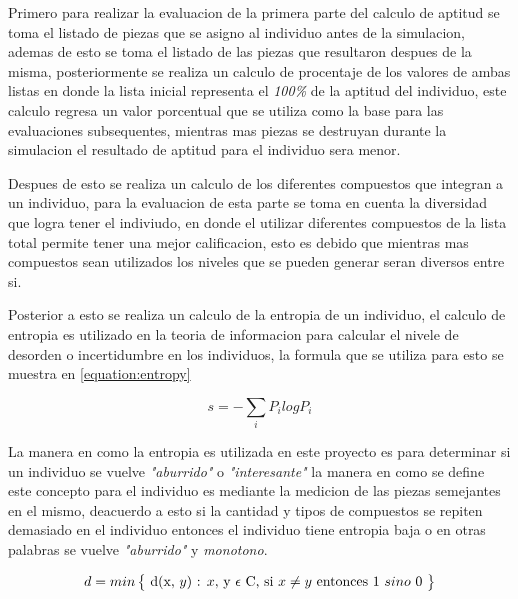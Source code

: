 Primero para realizar la evaluacion de la primera parte del calculo de aptitud
se toma el listado de piezas que se asigno al individuo antes de la simulacion,
ademas de esto se toma el listado de las piezas que resultaron despues de la
misma, posteriormente se realiza un calculo de procentaje de los valores de
ambas listas en donde la lista inicial representa el \textit{100\%} de la
aptitud del individuo, este calculo regresa un valor porcentual que se utiliza
como la base para las evaluaciones subsequentes, mientras mas piezas se
destruyan durante la simulacion el resultado de aptitud para el individuo sera
menor.

Despues de esto se realiza un calculo de los diferentes compuestos que integran
a un individuo, para la evaluacion de esta parte se toma en cuenta la diversidad
que logra tener el indiviudo, en donde el utilizar diferentes compuestos de la
lista total permite tener una mejor calificacion, esto es debido que mientras
mas compuestos sean utilizados los niveles que se pueden generar seran diversos
entre si.

Posterior a esto se realiza un calculo de la entropia de un individuo, el
calculo de entropia es utilizado en la teoria de informacion para calcular el
nivele de desorden o incertidumbre en los individuos, la formula que se utiliza
para esto se muestra en \ref{equation:entropy}

\begin{equation}
  s = -\sum _{i} P_i log P_i
  \label{equation:entropy}
\end{equation}

La manera en como la entropia es utilizada en este proyecto es para determinar
si un individuo se vuelve \textit{"aburrido"} o \textit{"interesante"} la manera
en como se define este concepto para el individuo es mediante la medicion de las
piezas semejantes en el mismo, deacuerdo a esto si la cantidad y tipos de
compuestos se repiten demasiado en el individuo entonces el individuo tiene
entropia baja o en otras palabras se vuelve \textit{"aburrido"} y
\textit{monotono}.

\begin{equation}
d = min \begin{Bmatrix} $ d(x, $ y)$ : $ x, $ y $ \epsilon $ C, si $ x \neq y $ entonces 1 $ sino $ 0 $ \end{Bmatrix}
\label{equation:hamming}
\end{equation}

